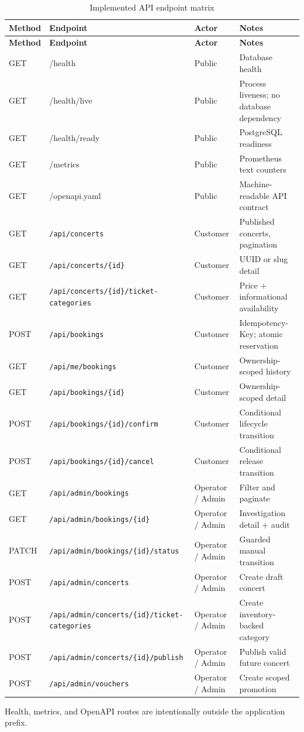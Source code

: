\begingroup
\setlength{\tabcolsep}{3pt}
\scriptsize
\begin{longtable}{p{}p{}p{}p{}}
\caption{Implemented API endpoint matrix}\label{tab:api-matrix}\\
\toprule
\textbf{Method} & \textbf{Endpoint} & \textbf{Actor} & \textbf{Notes} \\
\midrule
\endfirsthead
\toprule
\textbf{Method} & \textbf{Endpoint} & \textbf{Actor} & \textbf{Notes} \\
\midrule
\endhead
GET & /health & Public & Database health \\
GET & /health/live & Public & Process liveness; no database dependency \\
GET & /health/ready & Public & PostgreSQL readiness \\
GET & /metrics & Public & Prometheus text counters \\
GET & /openapi.yaml & Public & Machine-readable API contract \\
GET & \nolinkurl{/api/concerts} & Customer & Published concerts, pagination \\
GET & \nolinkurl{/api/concerts/{id}} & Customer & UUID or slug detail \\
GET & \nolinkurl{/api/concerts/{id}/ticket-categories} & Customer & Price + informational availability \\
POST & \nolinkurl{/api/bookings} & Customer & Idempotency-Key; atomic reservation \\
GET & \nolinkurl{/api/me/bookings} & Customer & Ownership-scoped history \\
GET & \nolinkurl{/api/bookings/{id}} & Customer & Ownership-scoped detail \\
POST & \nolinkurl{/api/bookings/{id}/confirm} & Customer & Conditional lifecycle transition \\
POST & \nolinkurl{/api/bookings/{id}/cancel} & Customer & Conditional release transition \\
GET & \nolinkurl{/api/admin/bookings} & Operator / Admin & Filter and paginate \\
GET & \nolinkurl{/api/admin/bookings/{id}} & Operator / Admin & Investigation detail + audit \\
PATCH & \nolinkurl{/api/admin/bookings/{id}/status} & Operator / Admin & Guarded manual transition \\
POST & \nolinkurl{/api/admin/concerts} & Operator / Admin & Create draft concert \\
POST & \nolinkurl{/api/admin/concerts/{id}/ticket-categories} & Operator / Admin & Create inventory-backed category \\
POST & \nolinkurl{/api/admin/concerts/{id}/publish} & Operator / Admin & Publish valid future concert \\
POST & \nolinkurl{/api/admin/vouchers} & Operator / Admin & Create scoped promotion \\
\bottomrule
\end{longtable}
\endgroup

Health, metrics, and OpenAPI routes are intentionally outside the application
 prefix.
